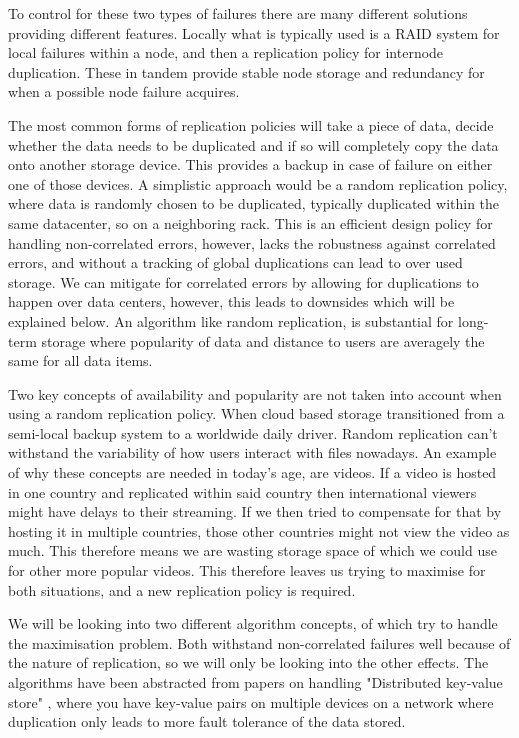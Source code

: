 \documentclass{UoYCSproject}
\begin{document}
To control for these two types of failures there are many different solutions providing different features. 
Locally what is typically used is a RAID system for local failures within a node, and then a replication policy \cite{Avalability storage} for internode duplication. 
These in tandem provide stable node storage and redundancy for when a possible node failure acquires.

The most common forms of replication policies will take a piece of data, decide whether the data needs to be duplicated and if so will completely copy the data onto another storage device. 
This provides a backup in case of failure on either one of those devices. 
A simplistic approach would be a random replication policy, where data is randomly chosen to be duplicated, typically duplicated within the same datacenter, so on a neighboring rack. 
This is an efficient design policy for handling non-correlated errors, however, lacks the robustness against correlated errors, and without a tracking of global duplications can lead to over used storage. 
We can mitigate for correlated errors by allowing for duplications to happen over data centers, however, this leads to downsides which will be explained below. 
An algorithm like random replication, is substantial for long-term storage where popularity of data and distance to users are averagely the same for all data items.

Two key concepts of availability and popularity are not taken into account when using a random replication policy. 
When cloud based storage transitioned from a semi-local backup system to a worldwide daily driver. 
Random replication can’t withstand the variability of how users interact with files nowadays. 
An example of why these concepts are needed in today's age, are videos. 
If a video is hosted in one country and replicated within said country then international viewers might have delays to their streaming. 
If we then tried to compensate for that by hosting it in multiple countries, those other countries might not view the video as much. 
This therefore means we are wasting storage space of which we could use for other more popular videos. 
This therefore leaves us trying to maximise for both situations, and a new replication policy is required.

We will be looking into two different algorithm concepts, of which try to handle the maximisation problem. 
Both withstand non-correlated failures well because of the nature of replication, so we will only be looking into the other effects. 
The algorithms have been abstracted from papers on handling "Distributed key-value store" \cite{Key-Value}, where you have key-value pairs on multiple devices on a network where duplication only leads to more fault tolerance of the data stored.
\end{document}

